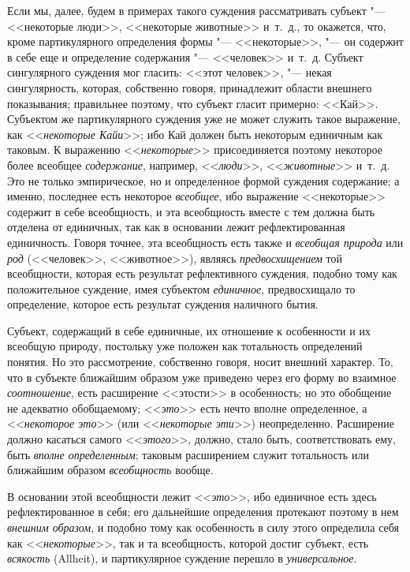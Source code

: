Если мы, далее, будем в примерах такого суждения рассматривать
субъект "--- <<некоторые люди>>, <<некоторые животные>> и~т.~д., то
окажется, что, кроме партикулярного определения формы
"--- <<некоторые>>, "--- он содержит в себе еще и
определение содержания "--- <<человек>> и~т.~д. Субъект
сингулярного суждения мог гласить: <<этот человек>>, "--- некая
сингулярность, которая, собственно говоря, принадлежит области внешнего
показывания; правильнее поэтому, что субъект гласит примерно: <<Кай>>.
Субъектом же партикулярного суждения уже не может служить такое выражение,
как <<{\em некоторые
Кайи}>>; ибо Кай должен быть некоторым единичным как таковым.
К выражению <<{\em некоторые}>>
присоединяется поэтому некоторое более всеобщее
{\em содержание},
например, <<{\em люди}>>,
<<{\em животные}>> и~т.~д.
Это не только эмпирическое, но и определенное формой суждения содержание; а
именно, последнее есть некоторое
{\em всеобщее}, ибо
выражение <<некоторые>> содержит в себе всеобщность, и эта всеобщность вместе
с тем должна быть отделена от единичных, так как в основании лежит
рефлектированная единичность. Говоря точнее, эта всеобщность есть также и
{\em всеобщая природа}
или {\em род}
(<<человек>>, <<животное>>), являясь
{\em предвосхищением} той
всеобщности, которая есть результат рефлективного суждения, подобно тому
как положительное суждение, имея субъектом
{\em единичное},
предвосхищало то определение, которое есть результат суждения
наличного бытия.

Субъект, содержащий в себе единичные, их отношение к
особенности и их всеобщую природу, постольку уже положен как тотальность
определений понятия. Но это рассмотрение, собственно говоря, носит внешний
характер. То, что в субъекте ближайшим образом уже приведено через его
форму во взаимное {\em соотношение},
есть расширение <<этости>> в особенность; но это обобщение не
адекватно обобщаемому; <<{\em это}>>
есть нечто вполне определенное, а
<<{\em некоторое это}>>
(или <<{\em некоторые
эти}>>) неопределенно. Расширение должно касаться самого
<<{\em этого}>>, должно,
стало быть, соответствовать ему, быть
{\em вполне определенным};
таковым расширением служит тотальность или ближайшим образом
{\em всеобщность}
вообще.

В основании этой всеобщности лежит
<<{\em это}>>, ибо
единичное есть здесь рефлектированное в себя; его дальнейшие определения
протекают поэтому в нем {\em внешним
образом}, и подобно тому как особенность в силу этого
определила себя как <<{\em некоторые}>>,
так и та всеобщность, которой достиг субъект, есть
{\em всякость}
(Allheit),
и партикулярное суждение перешло в
{\em универсальное}.

